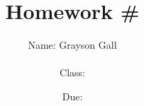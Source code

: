 \documentclass{article}
\title{\textbf{Homework \#}}
\author{
    Name: Grayson Gall
    \\ \\
    Class:
}
\date{Due: }
\begin{document}
\maketitle
\newpage

\section{}


\end{document}
